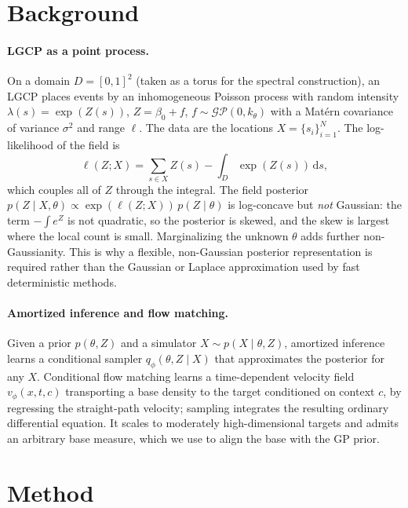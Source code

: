 \documentclass[10pt,twocolumn]{article}
\newcommand{\dd}{\,\mathrm{d}}
\begin{document}
\section{Background}
\label{sec:bg}

\paragraph{LGCP as a point process.}
On a domain $D=[0,1]^2$ (taken as a torus for the spectral construction), an LGCP
places events by an inhomogeneous Poisson process with random intensity
$\lambda(s)=\exp(Z(s))$, $Z=\beta_0+f$, $f\sim\mathcal{GP}(0,k_\theta)$ with a
Mat\'ern covariance of variance $\sigma^2$ and range $\ell$. The data are the
locations $X=\{s_i\}_{i=1}^N$. The log-likelihood of the field is
\begin{equation}
\ell(Z;X)=\sum_{s\in X} Z(s)-\int_D \exp(Z(s))\dd s,
\label{eq:coxll}
\end{equation}
which couples all of $Z$ through the integral. The field posterior
$p(Z\mid X,\theta)\propto \exp(\ell(Z;X))\,p(Z\mid\theta)$ is log-concave but
\emph{not} Gaussian: the term $-\int e^{Z}$ is not quadratic, so the posterior is
skewed, and the skew is largest where the local count is small. Marginalizing the
unknown $\theta$ adds further non-Gaussianity. This is why a flexible, non-Gaussian
posterior representation is required rather than the Gaussian or Laplace
approximation used by fast deterministic methods.

\paragraph{Amortized inference and flow matching.}
Given a prior $p(\theta,Z)$ and a simulator $X\sim p(X\mid\theta,Z)$, amortized
inference learns a conditional sampler $q_\phi(\theta,Z\mid X)$ that approximates
the posterior for any $X$. Conditional flow matching \citep{lipman2023flow,
dax2023flow} learns a time-dependent velocity field $v_\phi(x,t,c)$ transporting a
base density to the target conditioned on context $c$, by regressing the
straight-path velocity; sampling integrates the resulting ordinary differential
equation. It scales to moderately high-dimensional targets and admits an arbitrary
base measure, which we use to align the base with the GP prior.

\section{Method}
\label{sec:method}
\end{document}
